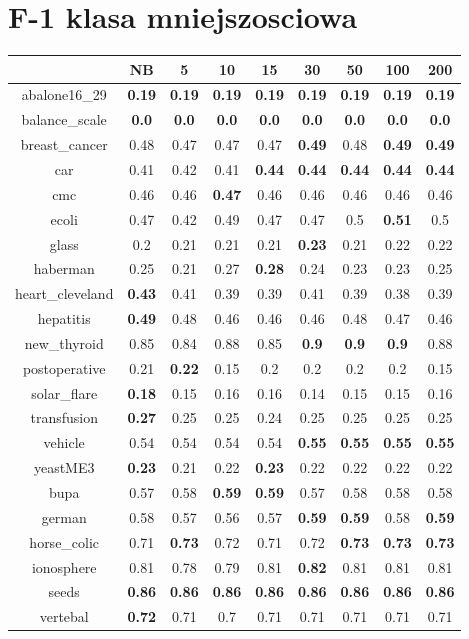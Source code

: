 \documentclass{article}%
\begin{document}
%
\section*{F{-}1 klasa mniejszosciowa}%
\begin{tabular}{c|cccccccc}%
\hline%
&NB&5&10&15&30&50&100&200\\%
\hline%
abalone16\_29&\textbf{0.19}&\textbf{0.19}&\textbf{0.19}&\textbf{0.19}&\textbf{0.19}&\textbf{0.19}&\textbf{0.19}&\textbf{0.19}\\%
\hline%
balance\_scale&\textbf{0.0}&\textbf{0.0}&\textbf{0.0}&\textbf{0.0}&\textbf{0.0}&\textbf{0.0}&\textbf{0.0}&\textbf{0.0}\\%
\hline%
breast\_cancer&0.48&0.47&0.47&0.47&\textbf{0.49}&0.48&\textbf{0.49}&\textbf{0.49}\\%
\hline%
car&0.41&0.42&0.41&\textbf{0.44}&\textbf{0.44}&\textbf{0.44}&\textbf{0.44}&\textbf{0.44}\\%
\hline%
cmc&0.46&0.46&\textbf{0.47}&0.46&0.46&0.46&0.46&0.46\\%
\hline%
ecoli&0.47&0.42&0.49&0.47&0.47&0.5&\textbf{0.51}&0.5\\%
\hline%
glass&0.2&0.21&0.21&0.21&\textbf{0.23}&0.21&0.22&0.22\\%
\hline%
haberman&0.25&0.21&0.27&\textbf{0.28}&0.24&0.23&0.23&0.25\\%
\hline%
heart\_cleveland&\textbf{0.43}&0.41&0.39&0.39&0.41&0.39&0.38&0.39\\%
\hline%
hepatitis&\textbf{0.49}&0.48&0.46&0.46&0.46&0.48&0.47&0.46\\%
\hline%
new\_thyroid&0.85&0.84&0.88&0.85&\textbf{0.9}&\textbf{0.9}&\textbf{0.9}&0.88\\%
\hline%
postoperative&0.21&\textbf{0.22}&0.15&0.2&0.2&0.2&0.2&0.15\\%
\hline%
solar\_flare&\textbf{0.18}&0.15&0.16&0.16&0.14&0.15&0.15&0.16\\%
\hline%
transfusion&\textbf{0.27}&0.25&0.25&0.24&0.25&0.25&0.25&0.25\\%
\hline%
vehicle&0.54&0.54&0.54&0.54&\textbf{0.55}&\textbf{0.55}&\textbf{0.55}&\textbf{0.55}\\%
\hline%
yeastME3&\textbf{0.23}&0.21&0.22&\textbf{0.23}&0.22&0.22&0.22&0.22\\%
\hline%
bupa&0.57&0.58&\textbf{0.59}&\textbf{0.59}&0.57&0.58&0.58&0.58\\%
\hline%
german&0.58&0.57&0.56&0.57&\textbf{0.59}&\textbf{0.59}&0.58&\textbf{0.59}\\%
\hline%
horse\_colic&0.71&\textbf{0.73}&0.72&0.71&0.72&\textbf{0.73}&\textbf{0.73}&\textbf{0.73}\\%
\hline%
ionosphere&0.81&0.78&0.79&0.81&\textbf{0.82}&0.81&0.81&0.81\\%
\hline%
seeds&\textbf{0.86}&\textbf{0.86}&\textbf{0.86}&\textbf{0.86}&\textbf{0.86}&\textbf{0.86}&\textbf{0.86}&\textbf{0.86}\\%
\hline%
vertebal&\textbf{0.72}&0.71&0.7&0.71&0.71&0.71&0.71&0.71\\%
\hline%
\end{tabular}
\end{document}
